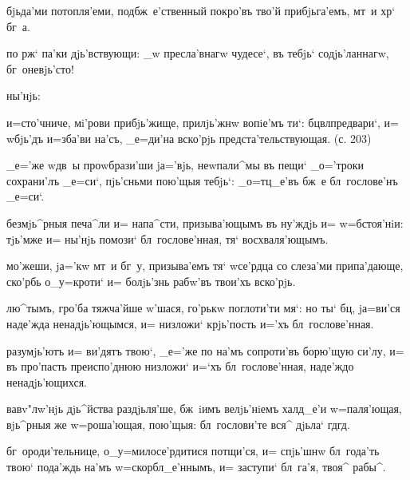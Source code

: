 бjьда'ми потопля'еми, под\ъ бж~е'ственный покро'въ тво'й 
прибjьга'емъ, мт~и хр` бг~а.

по рж` па'ки дjь'вствующи: _w пресла'внагw чудесе`, 
въ тебjь` содjь'ланнагw, бг~оневjь'сто!

ны'нjь:%


и=сто'чниче, мi'рови прибjь'жище, прилjь'жнw вопiе'мъ 
ти`: бц вл предвари`, и= w\т бjь'дъ и=зба'ви 
на'съ, _е=ди'на вско'рjь предста'тельствующая. (с. 203)


_е='же w\т дв~ы проwбрази'ши jа='вjь, неwпали^мы въ пещи` 
_о='троки сохрани'лъ _е=си`, пjь'сньми пою'щыя тебjь`: 
_о=тц_е'въ бж~е бл~гослове'нъ _е=си`.

безмjь^рныя печа^ли и= напа^сти, призыва'ющымъ въ ну'ждjь 
и= w=бстоя'нiи: тjь'мже и= ны'нjь помози` 
бл~гослове'нная, тя` восхваля'ющымъ.

мо'жеши, jа='кw мт~и бг~у, призыва'емъ тя` w\т се'рдца со 
слеза'ми припа'дающе, ско'рбь о_у=кроти` и= болjь'знь 
рабw'въ твои'хъ вско'рjь.

лю^тымъ, гро'ба тяжча'йше w'шася, го'рькw 
поглоти'ти мя`: но ты` бц, jа=ви'ся наде'жда 
ненадjь'ющымся, и= низложи` крjь'пость и='хъ 
бл~гослове'нная.

разумjь'ютъ и= ви'дятъ твою`, _е='же по на'мъ сопроти'въ 
борю'щую си'лу, и= въ про'пасть преиспо'днюю низложи` 
и=`хъ бл~гослове'нная, наде'ждо ненадjь'ющихся.


вавv"лw'нjь дjь^йства раздjьля'ше, бж~iимъ велjь'нiемъ 
халд_е'и w=паля'ющая, вjь^рныя же w=роша'ющая, пою'щыя: 
бл~гослови'те вся^ дjьла` гд гд.

бг~ороди'тельнице, о_у=милосе'рдитися потщи'ся, и= 
спjь'шнw бл~года'ть твою` пода'ждь на'мъ 
w=скорбл_е'ннымъ, и= заступи` бл~га'я, твоя^ рабы^.

